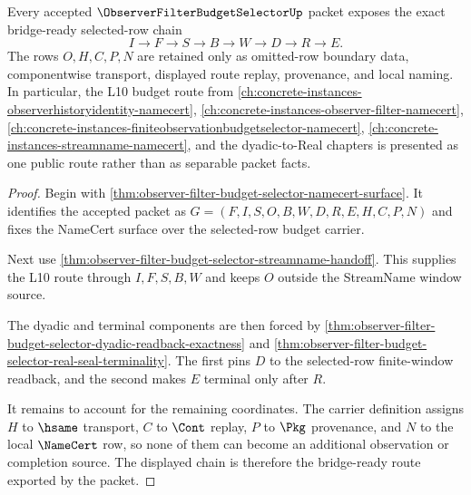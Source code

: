 \begin{theorem}
\label{thm:observer-filter-budget-selector-bridge-ready-route}
Every accepted $\ObserverFilterBudgetSelectorUp$ packet exposes the exact bridge-ready selected-row chain
$$
I \to F \to S \to B \to W \to D \to R \to E.
$$
The rows $O,H,C,P,N$ are retained only as omitted-row boundary data, componentwise transport, displayed route replay, provenance, and local naming. In particular, the L10 budget route from \autoref{ch:concrete-instances-observerhistoryidentity-namecert}, \autoref{ch:concrete-instances-observer-filter-namecert}, \autoref{ch:concrete-instances-finiteobservationbudgetselector-namecert}, \autoref{ch:concrete-instances-streamname-namecert}, and the dyadic-to-Real chapters is presented as one public route rather than as separable packet facts.
\end{theorem}
\begin{proof}
Begin with \autoref{thm:observer-filter-budget-selector-namecert-surface}. It identifies the accepted packet as $G=(F,I,S,O,B,W,D,R,E,H,C,P,N)$ and fixes the NameCert surface over the selected-row budget carrier.

Next use \autoref{thm:observer-filter-budget-selector-streamname-handoff}. This supplies the L10 route through $I,F,S,B,W$ and keeps $O$ outside the StreamName window source.

The dyadic and terminal components are then forced by \autoref{thm:observer-filter-budget-selector-dyadic-readback-exactness} and \autoref{thm:observer-filter-budget-selector-real-seal-terminality}. The first pins $D$ to the selected-row finite-window readback, and the second makes $E$ terminal only after $R$.

It remains to account for the remaining coordinates. The carrier definition assigns $H$ to $\hsame$ transport, $C$ to $\Cont$ replay, $P$ to $\Pkg$ provenance, and $N$ to the local $\NameCert$ row, so none of them can become an additional observation or completion source. The displayed chain is therefore the bridge-ready route exported by the packet.
\end{proof}

